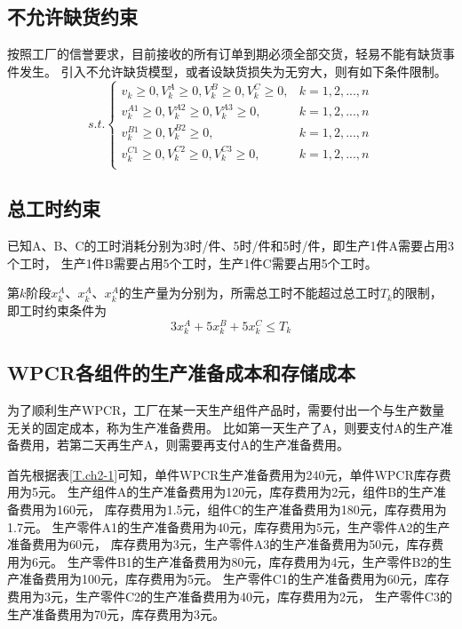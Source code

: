 \subsection{不允许缺货约束}

按照工厂的信誉要求，目前接收的所有订单到期必须全部交货，轻易不能有缺货事件发生。
引入不允许缺货模型，或者设缺货损失为无穷大，则有如下条件限制。
\begin{equation}
    s.t.
    \begin{cases}
        v_k \geqslant 0, V_k^A \geqslant 0,V_k^B \geqslant 0,V_k^C \geqslant 0, & k=1,2,...,n \\
        v_k^{A1} \geqslant 0, V_k^{A2} \geqslant 0,V_k^{A3} \geqslant 0, & k=1,2,...,n \\
        v_k^{B1} \geqslant 0, V_k^{B2} \geqslant 0, & k=1,2,...,n \\
        v_k^{C1} \geqslant 0, V_k^{C2} \geqslant 0,V_k^{C3} \geqslant 0, & k=1,2,...,n \\
    \end{cases}
\end{equation}

\subsection{总工时约束}

已知A、B、C的工时消耗分别为3时/件、5时/件和5时/件，即生产1件A需要占用3个工时，
生产1件B需要占用5个工时，生产1件C需要占用5个工时。

第$k$阶段$x_k^A$、$x_k^A$、$x_k^A$的生产量为分别为，所需总工时不能超过总工时$T_k$的限制，
即工时约束条件为
\begin{equation}
    3x_k^A + 5x_k^B + 5x_k^C \leq T_k
\end{equation}

\subsection{WPCR各组件的生产准备成本和存储成本}

为了顺利生产WPCR，工厂在某一天生产组件产品时，需要付出一个与生产数量无关的固定成本，称为生产准备费用。
比如第一天生产了A，则要支付A的生产准备费用，若第二天再生产A，则需要再支付A的生产准备费用。

首先根据表\ref{T.ch2-1}可知，单件WPCR生产准备费用为240元，单件WPCR库存费用为5元。
生产组件A的生产准备费用为120元，库存费用为2元，组件B的生产准备费用为160元，
库存费用为1.5元，组件C的生产准备费用为180元，库存费用为1.7元。
生产零件A1的生产准备费用为40元，库存费用为5元，生产零件A2的生产准备费用为60元，
库存费用为3元，生产零件A3的生产准备费用为50元，库存费用为6元。
生产零件B1的生产准备费用为80元，库存费用为4元，生产零件B2的生产准备费用为100元，库存费用为5元。
生产零件C1的生产准备费用为60元，库存费用为3元，生产零件C2的生产准备费用为40元，库存费用为2元，
生产零件C3的生产准备费用为70元，库存费用为3元。

